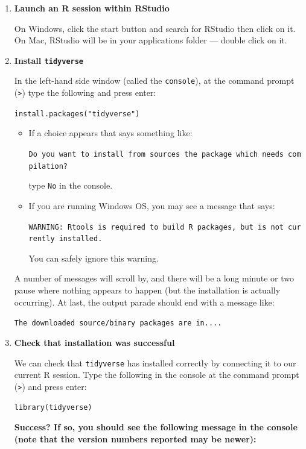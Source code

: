 \documentclass[
]{book}
\begin{document}
\begin{enumerate}
\def\labelenumi{\arabic{enumi}.}
\item
  \textbf{Launch an R session within RStudio}

  On Windows, click the start button and search for RStudio then click on it. On Mac,
  RStudio will be in your applications folder --- double click on it.
\item
  \textbf{Install \texttt{tidyverse}}

  In the left-hand side window (called the \texttt{console}), at the command prompt (\texttt{\textgreater{}}) type the following and press enter:

  \texttt{install.packages("tidyverse")}

  \begin{itemize}
  \item
    If a choice appears that says something like:

    \texttt{Do\ you\ want\ to\ install\ from\ sources\ the\ package\ which\ needs\ compilation?}

    type \texttt{No} in the console.
  \item
    If you are running Windows OS, you may see a message that says:

    \texttt{WARNING:\ Rtools\ is\ required\ to\ build\ R\ packages,\ but\ is\ not\ currently\ installed.}

    You can safely ignore this warning.
  \end{itemize}

  A number of messages will scroll by, and there will be a long minute or two
  pause where nothing appears to happen (but the installation is actually occurring).
  At last, the output parade should end with a message like:

  \texttt{The\ downloaded\ source/binary\ packages\ are\ in....}
\item
  \textbf{Check that installation was successful}

  We can check that \texttt{tidyverse} has installed correctly by connecting it to our current R session.
  Type the following in the console at the command prompt (\texttt{\textgreater{}}) and press enter:

  \texttt{library(tidyverse)}

  \begin{alert}

  \textbf{Success? If so, you should see the following message in the console (note that the version numbers reported may be newer):}


\end{alert}
\end{enumerate}
\end{document}
